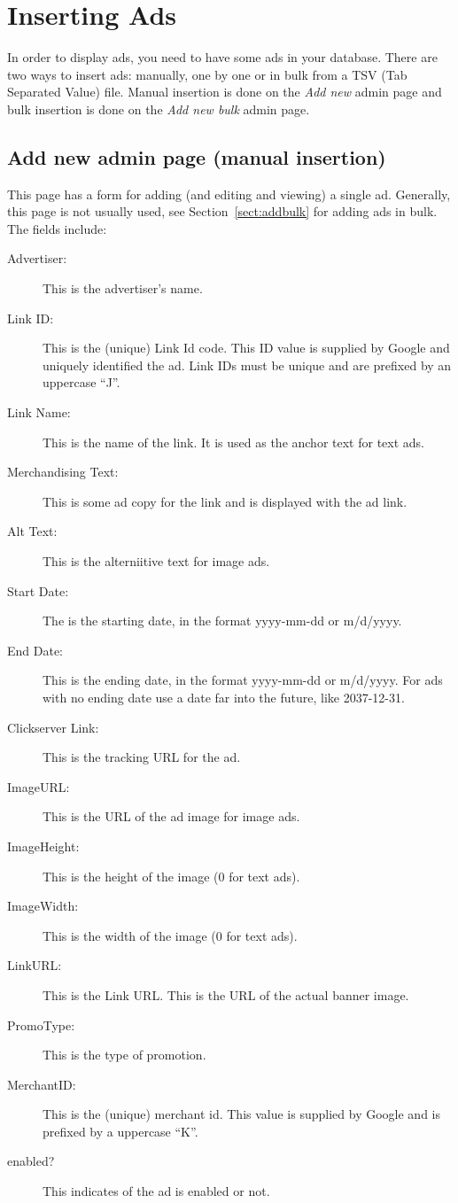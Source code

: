 \documentclass[letterpaper]{article}
\begin{document}
\section{Inserting Ads}

In order to display ads, you need to have some ads in your database.
There are two ways to insert ads: manually, one by one or in bulk from
a TSV (Tab Separated Value) file. Manual insertion is done on the
\emph{Add new} admin page and bulk insertion is done on the
\emph{Add new bulk} admin page.

\subsection{Add new admin page (manual insertion)}

This page has a form for adding (and editing and viewing) a single ad.
Generally, this page is not usually used, see Section~\ref{sect:addbulk}
for adding ads in bulk. The fields include: 

\begin{description}
  \item[Advertiser:] This is the advertiser's name.
  \item[Link ID:] This is the (unique) Link Id code. This ID value is
supplied by Google and uniquely identified the ad.  Link IDs must be
unique and are prefixed by an uppercase ``J''.
  \item[Link Name:] This is the name of the link.  It is used as the
anchor text for text ads.
  \item[Merchandising Text:] This is some ad copy for the
link and is displayed with the ad link.
  \item[Alt Text:] This is the alterniitive text for image
ads.
  \item[Start Date:] The is the starting date, in the format yyyy-mm-dd
or m/d/yyyy. 
  \item[End Date:] This is the ending date, in the format yyyy-mm-dd or
m/d/yyyy. For ads with no ending date use a date far into the future,
like 2037-12-31.
  \item[Clickserver Link:] This is the tracking URL for the ad. 
  \item[ImageURL:] This is the URL of the ad image for image ads. 
  \item[ImageHeight:] This is the height of the image (0 for text ads). 
  \item[ImageWidth:] This is the width of the image (0 for text ads). 
  \item[LinkURL:] This is the Link URL.  This is the URL of the actual
banner image.
  \item[PromoType:] This is the type of promotion.
  \item[MerchantID:] This is the (unique) merchant id.  This value is
supplied by Google and is prefixed by a uppercase ``K''.
  \item[enabled?] This indicates of the ad is enabled or
not. 
\end{description}
\end{document}

